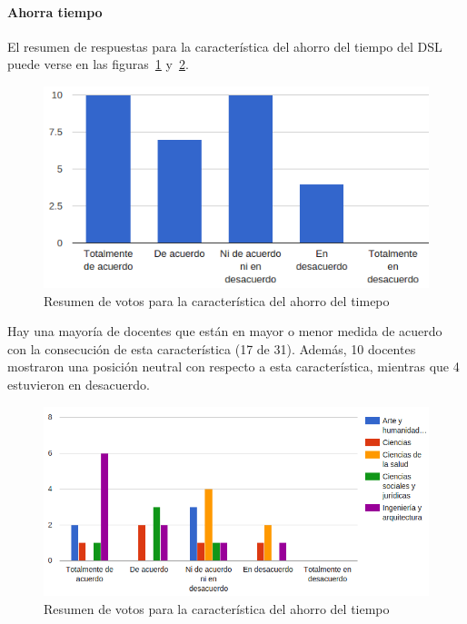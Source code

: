 \newpage
\paragraph*{Ahorra tiempo}

El resumen de respuestas para la característica del ahorro del tiempo del DSL puede verse en las figuras~\ref{fig:evalmetodo:dsl:ahorro} y~\ref{fig:evalmetodo:dsl:ahorro:rama}.

\begin{figure}[h]
  \begin{center}
    \includegraphics[scale=0.5]{C_DSL_ahorro.png}
  \end{center}
  \caption{Resumen de votos para la característica del ahorro del timepo}
  \label{fig:evalmetodo:dsl:ahorro}
\end{figure}

Hay una mayoría de docentes que están en mayor o menor medida de acuerdo con la consecución de esta característica (17 de 31). Además, 10 docentes mostraron una posición neutral con respecto a esta característica, mientras que 4 estuvieron en desacuerdo.

\begin{figure}[h]
  \begin{center}
    \includegraphics[scale=0.5]{C_DSL_ahorro_rama.png}
  \end{center}
  \caption{Resumen de votos para la característica del ahorro del tiempo}
  \label{fig:evalmetodo:dsl:ahorro:rama}
\end{figure}

